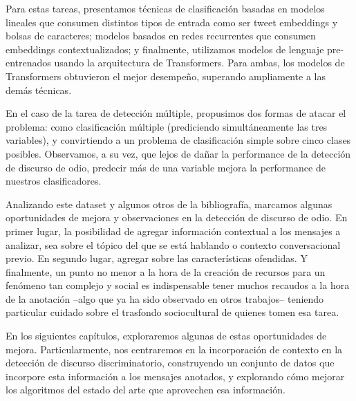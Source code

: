 Para estas tareas, presentamos técnicas de clasificación basadas en modelos lineales que consumen distintos tipos de entrada como ser tweet embeddings y bolsas de caracteres; modelos basados en redes recurrentes que consumen embeddings contextualizados; y finalmente, utilizamos modelos de lenguaje pre-entrenados usando la arquitectura de Transformers. Para ambas, los modelos de Transformers obtuvieron el mejor desempeño, superando ampliamente a las demás técnicas.

En el caso de la tarea de detección múltiple, propusimos dos formas de atacar el problema: como clasificación múltiple (prediciendo simultáneamente las tres variables), y convirtiendo a un problema de clasificación simple sobre cinco clases posibles. Observamos, a su vez, que lejos de dañar la performance de la detección de discurso de odio, predecir más de una variable mejora la performance de nuestros clasificadores.

Analizando este dataset y algunos otros de la bibliografía, marcamos algunas oportunidades de mejora y observaciones en la detección de discurso de odio. En primer lugar, la posibilidad de agregar información contextual a los mensajes a analizar, sea sobre el tópico del que se está hablando o contexto conversacional previo. En segundo lugar, agregar  sobre las características ofendidas. Y finalmente, un punto no menor a la hora de la creación de recursos para un fenómeno tan complejo y social es indispensable tener muchos recaudos a la hora de la anotación --algo que ya ha sido observado en otros trabajos-- teniendo particular cuidado sobre el trasfondo sociocultural de quienes tomen esa tarea.

En los siguientes capítulos, exploraremos algunas de estas oportunidades de mejora. Particularmente, nos centraremos en la incorporación de contexto en la detección de discurso discriminatorio, construyendo un conjunto de datos que incorpore esta información a los mensajes anotados, y explorando cómo mejorar los algoritmos del estado del arte que aprovechen esa información.
